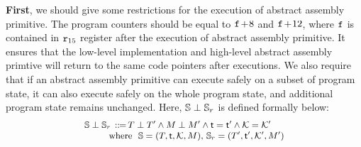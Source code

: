 \begin{definition}
\begin{enumerate}[1.]
    \end{enumerate}
\end{definition}

\textbf{First}, we should give some restrictions
for the execution of abstract assembly primitive.
The program counters should be equal to
$\texttt{f}_{}\!+\!8$ and $\texttt{f}_{}\!+\!12$, where $\texttt{f}_{}$
is contained in $\texttt{r}_{15}$ register after the execution
of abstract assembly primitive.
It ensures that the low-level implementation
and high-level abstract assembly primtive will return to
the same code pointers after executions.
We also require that
if an abstract assembly primitive
can execute safely on a subset of program state,
it can also execute safely on the whole program state,
and additional program state remains unchanged.
Here, $\mathbb{S}\perp\mathbb{S}_r$ is defined formally
below:
\[
    \small
    \begin{array}{l}
        \mathbb{S}\perp\mathbb{S}_r \, ::\!\!{=} \,
        T\perp T' \land
        M\perp M' \land \textsf{t} = \textsf{t}'
        \land \mathcal{K} = \mathcal{K}' \\
        \qquad \ \
        \text{where} \ \
        \mathbb{S} = (T, \textsf{t}, \mathcal{K}, M), \,
        \mathbb{S}_r = (T', \textsf{t}', \mathcal{K}', M')
    \end{array}
\]
